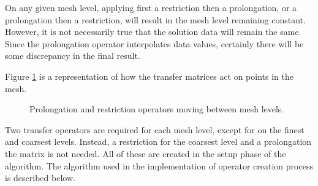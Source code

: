 On any given mesh level, applying first a restriction then a prolongation, or a prolongation then a restriction, will result in the mesh level remaining constant.
However, it is not necessarily true that the solution data will remain the same.
Since the prolongation operator interpolates data values, certainly there will be some discrepancy in the final result.

Figure \ref{fig:pro_res_ops} is a representation of how the transfer matrices act on points in the mesh.


\begin{figure}[h]
	\centering
	
	\caption{\label{fig:pro_res_ops} Prolongation and restriction operators moving between mesh levels.}
\end{figure}



Two transfer operators are required for each mesh level, except for on the finest and coarsest levels.
Instead, a restriction for the coarsest level and a prolongation the matrix is not needed.
All of these are created in the setup phase of the algorithm.
The algorithm used in the \oomph implementation of operator creation process is described below.

